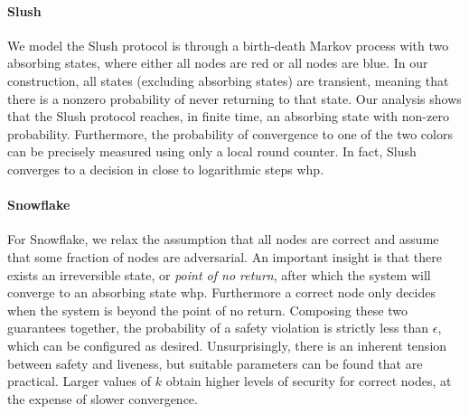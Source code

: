 \documentclass[letterpaper,twocolumn,10pt]{article}
\theoremstyle{definition}
\begin{document}
\paragraph{Slush}
We model the Slush protocol is through a birth-death Markov process with two absorbing states, where either all nodes are red or all nodes are blue. 
In our construction, all states (excluding absorbing states) are transient, meaning that there is a nonzero probability of never returning to that state. 
Our analysis shows that the Slush protocol reaches, in finite time, an absorbing state with non-zero probability.
Furthermore, the probability of convergence to one of the two colors can be precisely measured using only a local round counter. In fact, Slush converges to a decision in close to logarithmic steps whp.


\paragraph{Snowflake}
For Snowflake, we relax the assumption that all nodes are correct and assume that some fraction of nodes are adversarial.
An important insight is that there exists an irreversible state, or \textit{point of no return}, after which the system will converge to an absorbing state whp. Furthermore a correct node only decides when the system is beyond the point of no return. Composing these two guarantees together, the probability of a safety violation is strictly less than $\epsilon$, which can be configured as desired. 
Unsurprisingly, there is an inherent tension between safety and liveness, but suitable parameters can be found that are practical.
Larger values of $k$ obtain higher levels of security for correct nodes, at the expense of slower convergence. 
\end{document}
